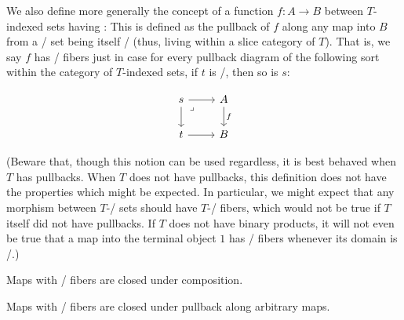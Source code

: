 \begin{definition}
We also define more generally the concept of a function $f : A \to B$ between $T$-indexed sets having : This is defined as the pullback of $f$ along any map into $B$ from a \repsmall/ set being itself \repsmall/ (thus, living within a slice category of $T$). That is, we say $f$ has \repsmall/ fibers just in case for every pullback diagram of the following sort within the category of $T$-indexed sets, if $t$ is \repsmall/, then so is $s$:

\[\begin{tikzcd}
	s & A \\
	t & B
	\arrow["f", from=1-2, to=2-2]
	\arrow[from=2-1, to=2-2]
	\arrow[from=1-1, to=2-1]
	\arrow[from=1-1, to=1-2]
	\arrow["\lrcorner"{anchor=center, pos=0.125}, draw=none, from=1-1, to=2-2]
\end{tikzcd}\]
\end{definition}

(Beware that, though this notion can be used regardless, it is best behaved when $T$ has pullbacks. When $T$ does not have pullbacks, this definition does not have the properties which might be expected. In particular, we might expect that any morphism between $T$-\repsmall/ sets should have $T$-\repsmall/ fibers, which would not be true if $T$ itself did not have pullbacks. If $T$ does not have binary products, it will not even be true that a map into the terminal object $1$ has \repsmall/ fibers whenever its domain is \repsmall/.)

\begin{theorem}
Maps with \repsmall/ fibers are closed under composition.
\end{theorem}

\begin{theorem}
Maps with \repsmall/ fibers are closed under pullback along arbitrary maps.
\end{theorem}

